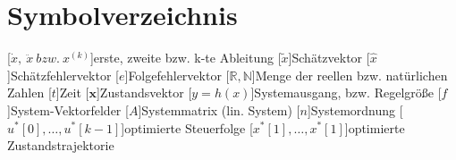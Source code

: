 \chapter*{Symbolverzeichnis}
\begin{acronym}[LabVIEW] %
	[\ensuremath{\dot{x},\ \ddot{x}\ bzw.\ x^{(k)}}]{erste, zweite bzw. k-te Ableitung}
	[\ensuremath{\tilde{x}}]{Schätzvektor}
	[\ensuremath{\hat{x}}]{Schätzfehlervektor}
	[\ensuremath{e}]{Folgefehlervektor}
	[\ensuremath{\mathbb{R},\mathbb{N}}]{Menge der reellen bzw. natürlichen Zahlen}
	[\ensuremath{t}]{Zeit}
	[\ensuremath{\mathbold{x}}]{Zustandsvektor}
	[\ensuremath{y = h(x)}]{Systemausgang, bzw. Regelgröße}
	[\ensuremath{f}]{System-Vektorfelder}
	[\ensuremath{A}]{Systemmatrix (lin. System)}
	[\ensuremath{n}]{Systemordnung}
	[\ensuremath{u^{\ast}[0],\ldots,u^{\ast}[k-1]}]{optimierte Steuerfolge}
	[\ensuremath{x^{\ast}[1],\ldots,x^{\ast}[1]}]{optimierte Zustandstrajektorie}
\end{acronym}